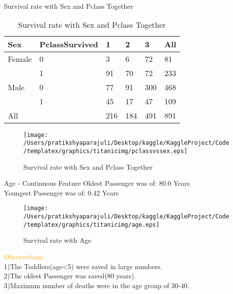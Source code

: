 \documentclass[
 size=14pt,
 paper=smartboard,  %
 mode=present, 		%
 display=slides, 	%
 style=tuliplab,  	%
 pauseslide,
 fleqn,leqno]{powerdot}
\begin{document}
\begin{slide}[toc=,bm=]{Survival rate with Sex and Pclass Together}
  \setlength{\abovecaptionskip}{0pt}
  \setlength{\belowcaptionskip}{10pt}
  \centering
  \begin{table}[tb]
    \setlength{\abovecaptionskip}{0pt}
    \setlength{\belowcaptionskip}{10pt}
    \centering
    \caption{Survival rate with Sex and Pclass Together}
    
    \begin{tabular}{p{1.5cm}p{1.9cm}p{1.5cm}p{1.9cm}p{2.9cm}p{2.9cm}}
    \hline
     Sex  & PclassSurvived & 1 & 2 &3  & All \\
    \hline
      Female  & 0    & 3    &  6    &  72   & 81  \\
              & 1    & 91   &  70   &  72   & 233  \\
      Male    & 0    & 77   &  91   &  300  & 468  \\
              & 1    & 45   &  17   &  47   & 109  \\
      All     &      & 216  &  184  &  491  & 891  \\
    \hline
    \end{tabular}
    \end{table}
    \vspace{0.1cm}
\begin{figure}
  \centering
  \centerline{
    \texttt{[image: /Users/pratikshyaparajuli/Desktop/kaggle/KaggleProject/Code/templatex/graphics/titanicimg/pclassvssex.eps]}
    }
  \caption{Survival rate with Sex and Pclass Together}\label{fig:sexvspclass}
\end{figure}
\end{slide}
\begin{slide}[toc=,bm=]{Age - Continuous Feature}
  Oldest Passenger was of: 80.0 Years \\
  Youngest Passenger was of: 0.42 Years 
\vspace{0.1cm}
\begin{figure}
  \centering
  \centerline{
    \texttt{[image: /Users/pratikshyaparajuli/Desktop/kaggle/KaggleProject/Code/templatex/graphics/titanicimg/age.eps]}
    }
  \caption{Survival rate with Age }\label{fig:age}
\end{figure}
\textcolor{orange}{Observations:}\\
1)The Toddlers(age<5) were saved in large numbers.\\
2)The oldest Passenger was saved(80 years).\\
3)Maximum number of deaths were in the age group of 30-40.
\end{slide}
\end{document}
